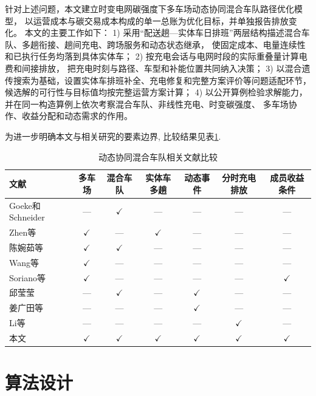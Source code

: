 \documentclass{setp-new}
\newcommand{\setptabsetup}{\fontsize{9pt}{10.5pt}\selectfont\renewcommand{\arraystretch}{0.95}\setlength{\tabcolsep}{2.2pt}\setlength{\aboverulesep}{0.4pt}\setlength{\belowrulesep}{0.4pt}\hbadness=10000}
\begin{document}
针对上述问题，本文建立时变电网碳强度下多车场动态协同混合车队路径优化模型，
以运营成本与碳交易成本构成的单一总账为优化目标，并单独报告排放变化。
本文的主要工作如下：
1) 采用“配送趟—实体车日排班”两层结构描述混合车队、多趟衔接、趟间充电、跨场服务和动态状态继承，
使固定成本、电量连续性和已执行任务均落到具体实体车；
2) 按充电会话与电网时段的实际重叠量计算电费和间接排放，
把充电时刻与路径、车型和补能位置共同纳入决策；
3) 以混合遗传搜索为基础，设置实体车排班补全、充电修复和完整方案评价等问题适配环节，
候选解的可行性与目标值均按完整运营方案计算；
4) 以公开算例检验求解能力，并在同一构造算例上依次考察混合车队、非线性充电、时变碳强度、
多车场协作、收益分配和动态需求的作用。

为进一步明确本文与相关研究的要素边界, 比较结果见表\ref{tab:literature-comparison}.

\begin{table}[H]
\centering
\caption{动态协同混合车队相关文献比较}
\label{tab:literature-comparison}
\setptabsetup
\begin{tabular*}{\linewidth}{@{\extracolsep{\fill}}lcccccc@{}}
\toprule
文献 & 多车场 & 混合车队 & 实体车多趟 & 动态事件 & 分时充电排放 & 成员收益条件\\
\midrule
Goeke和Schneider\cite{ref:27} & --- & $\checkmark$ & --- & --- & --- & ---\\
Zhen等\cite{ref:44} & $\checkmark$ & --- & $\checkmark$ & --- & --- & ---\\
陈婉茹等\cite{ref:23} & $\checkmark$ & $\checkmark$ & --- & --- & --- & ---\\
Wang等\cite{ref:7} & $\checkmark$ & --- & --- & --- & --- & ---\\
Soriano等\cite{ref:8} & $\checkmark$ & --- & --- & --- & --- & $\checkmark$\\
邱莹莹\cite{ref:71} & --- & $\checkmark$ & --- & $\checkmark$ & --- & ---\\
姜广田等\cite{ref:51} & --- & --- & --- & $\checkmark$ & --- & ---\\
Li等\cite{ref:52} & --- & --- & --- & --- & $\checkmark$ & ---\\
本文 & $\checkmark$ & $\checkmark$ & $\checkmark$ & $\checkmark$ & $\checkmark$ & $\checkmark$\\
\bottomrule
\end{tabular*}
\end{table}



\section{算法设计}
\end{document}
